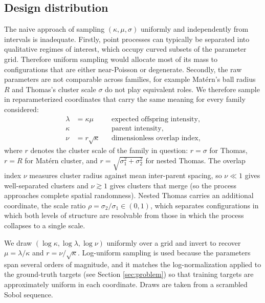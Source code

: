 \documentclass[11pt,letterpaper]{article}
\newcommand{\1}{\mathds{1}}
\theoremstyle{plain}
\theoremstyle{definitioncolon}
\begin{document}
\subsection{Design distribution}
The naive approach of sampling $(\kappa, \mu, \sigma)$ uniformly and
independently from intervals is inadequate. Firstly, point processes can
typically be separated into qualitative regimes of interest, which occupy curved
subsets of the parameter grid. Therefore uniform sampling would allocate most of
its mass to configurations that are either near-Poisson or degenerate. Secondly,
the raw parameters are not comparable across families, for example Mat\'ern's
ball radius $R$ and Thomas's cluster scale $\sigma$ do not play equivalent roles.
We therefore sample in reparameterized coordinates that carry the same meaning
for every family considered:
    \begin{align*}
        \lambda &= \kappa\mu && \text{expected offspring intensity,} \\
        \kappa & && \text{parent intensity,} \\
        \nu &= r\sqrt{\kappa} && \text{dimensionless overlap index,}
    \end{align*}
where $r$ denotes the cluster scale of the family in question: $r = \sigma$ for
Thomas, $r = R$ for Mat\'ern cluster, and $r = \sqrt{\sigma_1^2 + \sigma_2^2}$
for nested Thomas. The overlap index $\nu$ measures cluster radius against mean
inter-parent spacing, so $\nu \ll 1$ gives well-separated clusters and
$\nu \gtrsim 1$ gives clusters that merge (so the process approaches complete
spatial randomness). Nested Thomas carries an additional coordinate, the scale
ratio $\rho = \sigma_2/\sigma_1 \in (0,1)$, which separates configurations in
which both levels of structure are resolvable from those in which the process
collapses to a single scale.

We draw $(\log\kappa, \log\lambda, \log\nu)$ uniformly over a grid and invert to
recover $\mu = \lambda/\kappa$ and $r = \nu/\sqrt{\kappa}$. Log-uniform sampling
is used because the parameters span several orders of magnitude, and it matches
the log-normalization applied to the ground-truth targets (see
Section \ref{sec:problem}) so that training targets are approximately uniform in
each coordinate. Draws are taken from a scrambled Sobol sequence.
\end{document}
